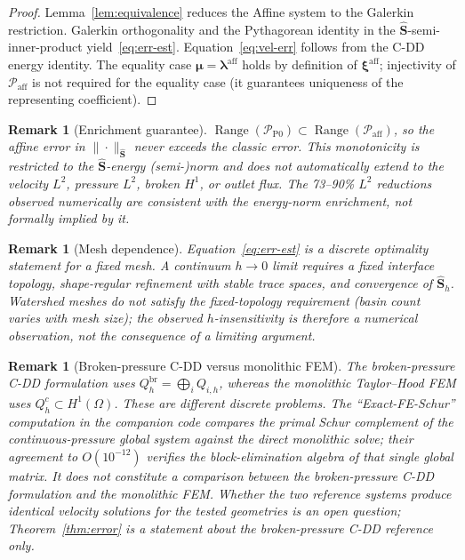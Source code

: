 \documentclass[11pt,a4paper]{article}
\newtheorem{remark}[lemma]{Remark}
\newcommand{\dom}{\Omega}
\newcommand{\trac}{\bm{\lambda}}
\newcommand{\Schur}{\mathbf{S}}
\begin{document}
\begin{proof}
  Lemma~\ref{lem:equivalence} reduces the Affine system to the Galerkin
  restriction.  Galerkin orthogonality and the Pythagorean identity in
  the $\widehat{\Schur}$-semi-inner-product yield~\eqref{eq:err-est}.
  Equation~\eqref{eq:vel-err} follows from the C-DD energy identity.
  The equality case $\bm{\mu} = \trac^{\text{aff}}$ holds by definition
  of $\bm{\xi}^{\text{aff}}$; injectivity of $\mathcal{P}_{\text{aff}}$
  is not required for the equality case (it guarantees uniqueness of
  the representing coefficient).
\end{proof}

\begin{remark}[Enrichment guarantee]\label{rem:enrichment}
  $\operatorname{Range}(\mathcal{P}_{\text{P0}})
   \subset \operatorname{Range}(\mathcal{P}_{\text{aff}})$,
  so the affine error in $\|\cdot\|_{\widehat{\Schur}}$ never exceeds
  the classic error.  This monotonicity is restricted to the
  $\widehat{\Schur}$-energy (semi-)norm and does not automatically
  extend to the velocity $L^2$, pressure $L^2$, broken $H^1$,
  or outlet flux.  The 73--90\% $L^2$ reductions observed numerically
  are \emph{consistent} with the energy-norm enrichment, not formally
  implied by it.
\end{remark}

\begin{remark}[Mesh dependence]\label{rem:mesh}
  Equation~\eqref{eq:err-est} is a discrete optimality statement for
  a fixed mesh.  A continuum $h \to 0$ limit requires a fixed interface
  topology, shape-regular refinement with stable trace spaces, and
  convergence of $\widehat{\Schur}_h$.  Watershed meshes do not satisfy
  the fixed-topology requirement (basin count varies with mesh size);
  the observed $h$-insensitivity is therefore a numerical observation,
  not the consequence of a limiting argument.
\end{remark}

\begin{remark}[Broken-pressure C-DD versus monolithic FEM]\label{rem:monolithic}
  The broken-pressure C-DD formulation uses $Q_h^{\text{br}}
  = \bigoplus_i Q_{i,h}$, whereas the monolithic Taylor--Hood FEM
  uses $Q_h^c \subset H^1(\dom)$.
  These are different discrete problems.
  The ``Exact-FE-Schur'' computation in the companion code compares the
  primal Schur complement of the \emph{continuous}-pressure global system
  against the direct monolithic solve; their agreement to $O(10^{-12})$
  verifies the block-elimination algebra of that single global matrix.
  It does \emph{not} constitute a comparison between the broken-pressure
  C-DD formulation and the monolithic FEM.
  Whether the two reference systems produce identical velocity solutions
  for the tested geometries is an open question; Theorem~\ref{thm:error}
  is a statement about the broken-pressure C-DD reference only.
\end{remark}
\end{document}
